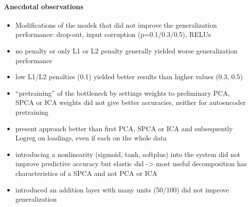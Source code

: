 \documentclass{article} %
\begin{document}
\paragraph{Anecdotal observations}
\begin{itemize}
  \item{Modifications of the modek that did not improve the generalization performance:
  drop-out, input corruption (p=0.1/0.3/0.5), RELUs}
  \item{no penalty or only L1 or L2 penalty generally yielded worse
  generalization performance}
  \item{low L1/L2 penalties (0.1) yielded better results
  than higher values (0.3, 0.5)}
  \item{``pretraining'' of the bottleneck by settings weights to
  preliminary PCA, SPCA or ICA weights did not give better accuracies,
  neither for autoencoder pretraining }
  \item{present approach better than first PCA, SPCA or ICA and
  subsequently Logreg on loadings, even if each on the whole data}
  \item{introducing a
  nonlinearity (sigmoid, tanh, softplus) into the system
  did not improve predictive accuracy but
  elastic did -> most useful decomposition has characteristics of a SPCA
  and not PCA or ICA}
  \item{introduced an addition layer with many units (50/100) did not
  improve generalization}
\end{itemize}
\end{document}
